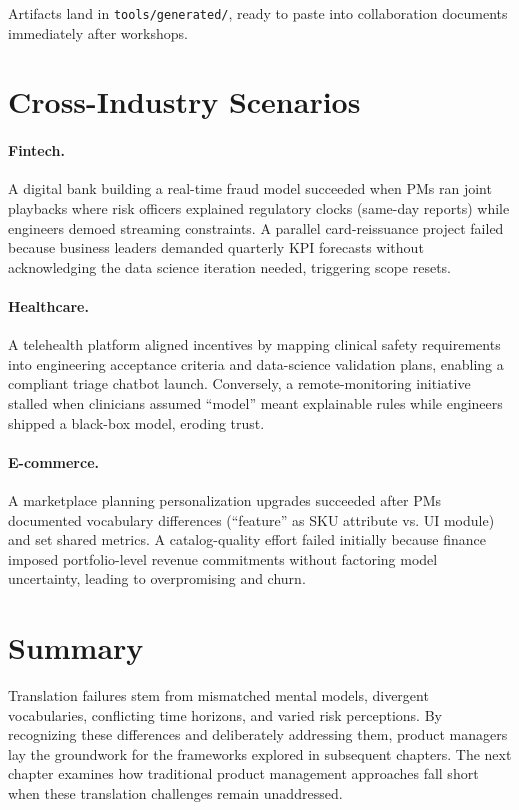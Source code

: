 Artifacts land in \texttt{tools/generated/}, ready to paste into collaboration documents immediately after workshops.

\section{Cross-Industry Scenarios}
\label{sec:translation-examples}

\paragraph{Fintech.} A digital bank building a real-time fraud model succeeded when PMs ran joint playbacks where risk officers explained regulatory clocks (same-day reports) while engineers demoed streaming constraints. A parallel card-reissuance project failed because business leaders demanded quarterly KPI forecasts without acknowledging the data science iteration needed, triggering scope resets.

\paragraph{Healthcare.} A telehealth platform aligned incentives by mapping clinical safety requirements into engineering acceptance criteria and data-science validation plans, enabling a compliant triage chatbot launch. Conversely, a remote-monitoring initiative stalled when clinicians assumed ``model'' meant explainable rules while engineers shipped a black-box model, eroding trust.

\paragraph{E-commerce.} A marketplace planning personalization upgrades succeeded after PMs documented vocabulary differences (``feature'' as SKU attribute vs. UI module) and set shared metrics. A catalog-quality effort failed initially because finance imposed portfolio-level revenue commitments without factoring model uncertainty, leading to overpromising and churn.

\section{Summary}
\label{sec:translation-summary}

Translation failures stem from mismatched mental models, divergent vocabularies, conflicting time horizons, and varied risk perceptions. By recognizing these differences and deliberately addressing them, product managers lay the groundwork for the frameworks explored in subsequent chapters. The next chapter examines how traditional product management approaches fall short when these translation challenges remain unaddressed.

